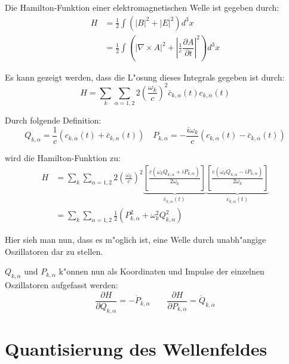 Die Hamilton-Funktion einer elektromagnetischen Welle ist gegeben durch:
\begin{equation}
\begin{split}
H &= \frac{1}{2} \int (|B|^2 + |E|^2) d^3 x \\
	&= \frac{1}{2} \int \left(| \nabla\times A |^2 + \left| \frac{1}{c} \dfrac{\partial A}{\partial t} \right|^2 \right) d^3 x 
\end{split}
\end{equation}

Es kann gezeigt werden, dass die L"osung dieses Integrals gegeben ist durch:
\begin{equation}
H = \sum_k \sum_{\alpha=1,2} 2 \left(\frac{\omega_k}{c}\right)^2 \bar{c}_{k,\alpha}(t) c_{k,\alpha}(t)
\end{equation}

Durch folgende Definition:
\begin{equation}
Q_{k,\alpha} = \frac{1}{c}(c_{k,\alpha}(t) + \bar{c}_{k,\alpha}(t)) \quad P_{k,\alpha} = -\frac{i\omega_k}{c}(c_{k,\alpha}(t) - \bar{c}_{k,\alpha}(t)) 
\end{equation}

wird die Hamilton-Funktion zu:
\begin{equation} \label{fq:hamilton}
\begin{split}
H &= \sum_k \sum_{\alpha=1,2} 2 \left(\frac{\omega_k}{c}\right)^2 \underbrace{\left[ \frac{c(\omega_k Q_{k,\alpha} + i P_{k,\alpha})}{2 \omega_k} \right]}_{\bar{c}_{k,\alpha}(t)} \underbrace{\left[ \frac{c(\omega_k Q_{k,\alpha} - i P_{k,\alpha})}{2 \omega_k} \right]}_{c_{k,\alpha}(t)}\\
&= \sum_k \sum_{\alpha=1,2} \frac{1}{2} (P_{k,\alpha}^2 + \omega_k^2 Q_{k,\alpha}^2)
\end{split}
\end{equation}

Hier sieh man nun, dass es m"oglich ist, eine Welle durch unabh"angige Oszillatoren dar zu stellen.

$Q_{k,\alpha}$ und $P_{k,\alpha}$ k"onnen nun als Koordinaten und Impulse der einzelnen Oszillatoren aufgefasst werden:
\begin{equation}
\dfrac{\partial H}{\partial Q_{k,\alpha}} = -\dot{P}_{k,\alpha} \qquad \dfrac{\partial H}{\partial P_{k,\alpha}} = \dot{Q}_{k,\alpha}
\end{equation}

\section{Quantisierung des Wellenfeldes}

